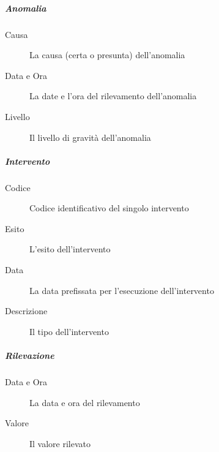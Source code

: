 \subparagraph{Anomalia}
\begin{description}
\item[Causa] La causa (certa o presunta) dell'anomalia
\item[Data e Ora] La date e l'ora del rilevamento dell'anomalia
\item[Livello] Il livello di gravità dell'anomalia
\end{description}
\subparagraph{Intervento}
\begin{description}
\item[Codice] Codice identificativo del singolo intervento
\item[Esito] L'esito dell'intervento
\item[Data] La data prefissata per l'esecuzione dell'intervento
\item[Descrizione] Il tipo dell'intervento
\end{description}
\subparagraph{Rilevazione}
\begin{description}
\item[Data e Ora] La data e ora del rilevamento
\item[Valore] Il valore rilevato
\end{description}
